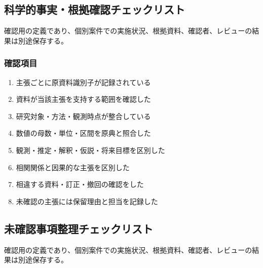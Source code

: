 \documentclass[a4paper,11pt]{article}
\begin{document}
\subsection{科学的事実・根拠確認チェックリスト}
\par 確認用の定義であり、個別案件での実施状況、根拠資料、確認者、レビューの結果は別途保存する。\par\medskip
\subsubsection*{確認項目}
\begin{enumerate}[leftmargin=2em,itemsep=0.3em]
\item 主張ごとに原資料識別子が記録されている\par
\item 資料が当該主張を支持する範囲を確認した\par
\item 研究対象・方法・観測時点が整合している\par
\item 数値の母数・単位・区間を原典と照合した\par
\item 観測・推定・解釈・仮説・将来目標を区別した\par
\item 相関関係と因果的な主張を区別した\par
\item 相違する資料・訂正・撤回の確認をした\par
\item 未確認の主張には保留理由と担当を記録した\par
\end{enumerate}
\subsection{未確認事項整理チェックリスト}
\par 確認用の定義であり、個別案件での実施状況、根拠資料、確認者、レビューの結果は別途保存する。\par\medskip
\end{document}
